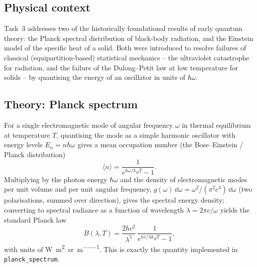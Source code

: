 \documentclass[11pt]{article}
\begin{document}
\subsection{Physical context}
Task~3 addresses two of the historically foundational results of early quantum theory: the Planck spectral distribution of black-body radiation, and the Einstein model of the specific heat of a solid. Both were introduced to resolve failures of classical (equipartition-based) statistical mechanics -- the ultraviolet catastrophe for radiation, and the failure of the Dulong--Petit law at low temperature for solids -- by quantising the energy of an oscillator in units of $\hbar\omega$.

\subsection{Theory: Planck spectrum}
For a single electromagnetic mode of angular frequency $\omega$ in thermal equilibrium at temperature $T$, quantising the mode as a simple harmonic oscillator with energy levels $E_n = n\hbar\omega$ gives a mean occupation number (the Bose--Einstein / Planck distribution)
\begin{equation}
\langle n\rangle = \frac{1}{e^{\hbar\omega/k_BT}-1}.
\end{equation}
Multiplying by the photon energy $\hbar\omega$ and the density of electromagnetic modes per unit volume and per unit angular frequency, $g(\omega)\,\dd\omega = \omega^2/(\pi^2 c^3)\,\dd\omega$ (two polarisations, summed over direction), gives the spectral energy density; converting to spectral radiance as a function of wavelength $\lambda = 2\pi c/\omega$ yields the standard Planck law
\begin{equation}
\label{eq:planck}
B(\lambda,T) = \frac{2hc^2}{\lambda^5}\,\frac{1}{e^{hc/\lambda k_B T}-1},
\end{equation}
with units of \si{\watt\per\square\meter\per\steradian\per\meter}. This is exactly the quantity implemented in \texttt{planck\_spectrum}.
\end{document}
